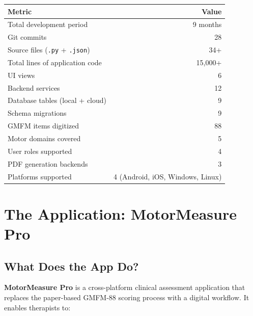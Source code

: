 \documentclass[11pt,a4paper]{article}
\begin{document}
\begin{table}[H]
\centering
\renewcommand{\arraystretch}{1.4}
\begin{tabularx}{0.7\textwidth}{X r}
\toprule
\textbf{Metric} & \textbf{Value} \\
\midrule
Total development period                         & 9 months \\
Git commits                                      & 28 \\
Source files (\texttt{.py} + \texttt{.json})     & 34+ \\
Total lines of application code                   & 15,000+ \\
UI views                                          & 6 \\
Backend services                                  & 12 \\
Database tables (local + cloud)                   & 9 \\
Schema migrations                                 & 9 \\
GMFM items digitized                             & 88 \\
Motor domains covered                             & 5 \\
User roles supported                              & 4 \\
PDF generation backends                           & 3 \\
Platforms supported                               & 4 (Android, iOS, Windows, Linux) \\
\bottomrule
\end{tabularx}
\end{table}

\section{The Application: MotorMeasure Pro}

\subsection{What Does the App Do?}

\textbf{MotorMeasure Pro} is a cross-platform clinical assessment application that replaces the paper-based GMFM-88 scoring process with a digital workflow. It enables therapists to:
\end{document}
